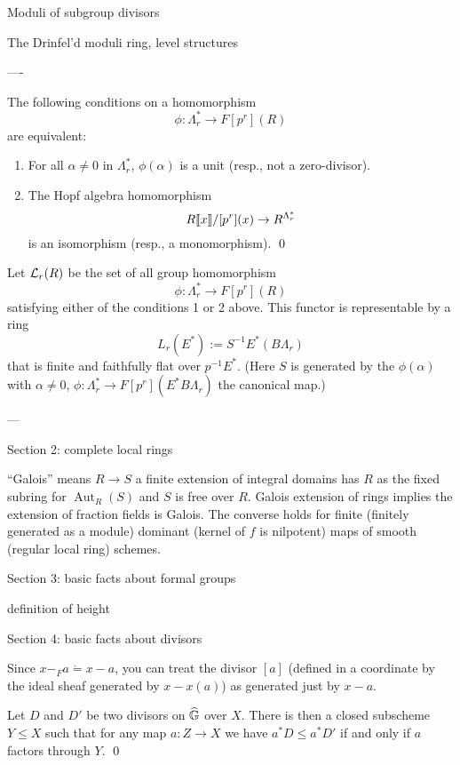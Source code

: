 Moduli of subgroup divisors


The Drinfel'd moduli ring, level structures

----

\begin{lemma}
The following conditions on a homomorphism \[\phi: \Lambda_r^* \to F[p^r](R)\] are equivalent:
\begin{enumerate}
\item For all $\alpha \ne 0$ in $\Lambda_r^*$, $\phi(\alpha)$ is a unit (resp., not a zero-divisor).
\item The Hopf algebra homomorphism \[R\llbracket{x}\rrbracket / [p^r](x) \to R^{\Lambda_r^*}\] is an isomorphism (resp., a monomorphism). \qed
\end{enumerate}
\end{lemma}

\begin{lemma}
Let $\mathcal{L}_r(R)$ be the set of all group homomorphism \[\phi: \Lambda_r^* \to F[p^r](R)\] satisfying either of the conditions 1 or 2 above.  This functor is representable by a ring \[L_r(E^*) := S^{-1} E^*(B\Lambda_r)\] that is finite and faithfully flat over $p^{-1} E^*$.  (Here $S$ is generated by the $\phi(\alpha)$ with $\alpha \ne 0$, $\phi: \Lambda_r^* \to F[p^r](E^* B\Lambda_r)$ the canonical map.)
\end{lemma}

---

Section 2: complete local rings

``Galois'' means $R \to S$ a finite extension of integral domains has $R$ as the fixed subring for $\operatorname{Aut}_R(S)$ and $S$ is free over $R$.  Galois extension of rings implies the extension of fraction fields is Galois.  The converse holds for finite (finitely generated as a module) dominant (kernel of $f$ is nilpotent) maps of smooth (regular local ring) schemes.

Section 3: basic facts about formal groups

definition of height

Section 4: basic facts about divisors

Since $x -_F a \dot= x - a$, you can treat the divisor $[a]$ (defined in a coordinate by the ideal sheaf generated by $x - x(a)$) as generated just by $x - a$.

\begin{lemma}
Let $D$ and $D'$ be two divisors on $\widehat{\mathbb G}$ over $X$.  There is then a closed subscheme $Y \le X$ such that for any map $a: Z \to X$ we have $a^* D \le a^* D'$ if and only if $a$ factors through $Y$. \qed
\end{lemma}

